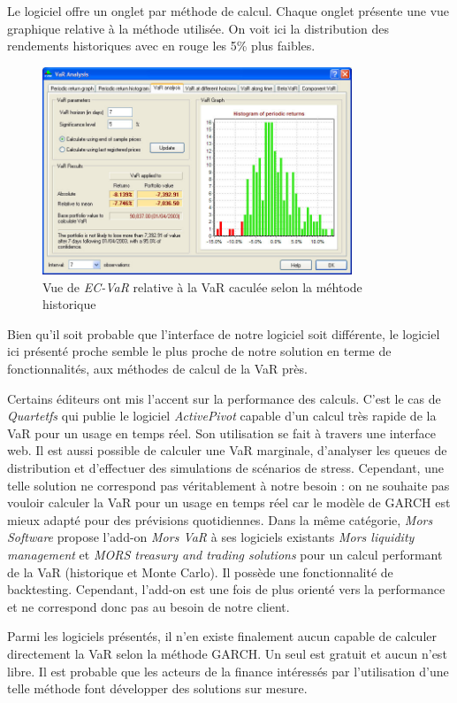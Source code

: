 		Le logiciel offre un onglet par méthode de calcul. Chaque onglet présente une vue graphique relative à la méthode utilisée. On voit ici la distribution des rendements historiques avec en rouge les 5\% plus faibles.

		\begin{figure}[h]
			\center
			\includegraphics[width=350px]{ecvar_1b.jpg}
			\caption{Vue de \textit{EC-VaR} relative à la VaR caculée selon la méhtode historique}
			\label{ajustement_garch}
		\end{figure}

		Bien qu’il soit probable que l’interface de notre logiciel soit différente, le logiciel ici présenté proche semble le plus proche de notre solution en terme de fonctionnalités, aux méthodes de calcul de la VaR près. %

		Certains éditeurs ont mis l’accent sur la performance des calculs. C’est le cas de \textit{Quartetfs} qui publie le logiciel \textit{ActivePivot} capable d’un calcul très rapide de la VaR pour un usage en temps réel. Son utilisation se fait à travers une interface web. Il est aussi possible de calculer une VaR marginale, d’analyser les queues de distribution et d’effectuer des simulations de scénarios de stress. Cependant, une telle solution ne correspond pas véritablement à notre besoin : on ne souhaite pas vouloir calculer la VaR pour un usage en temps réel car le modèle de GARCH est mieux adapté pour des prévisions quotidiennes.	Dans la même catégorie, \textit{Mors Software} propose l’add-on \textit{Mors VaR} à ses logiciels existants \textit{Mors liquidity management} et \textit{MORS treasury and trading solutions} pour un calcul performant de la VaR (historique et Monte Carlo). Il possède une fonctionnalité de backtesting. Cependant, l’add-on est une fois de plus orienté vers la performance et ne correspond donc pas au besoin de notre client.

		Parmi les logiciels présentés, il n’en existe finalement aucun capable de calculer directement la VaR selon la méthode GARCH. Un seul est gratuit et aucun n’est libre. Il est probable que les acteurs de la finance intéressés par l’utilisation d’une telle méthode font développer des solutions sur mesure.